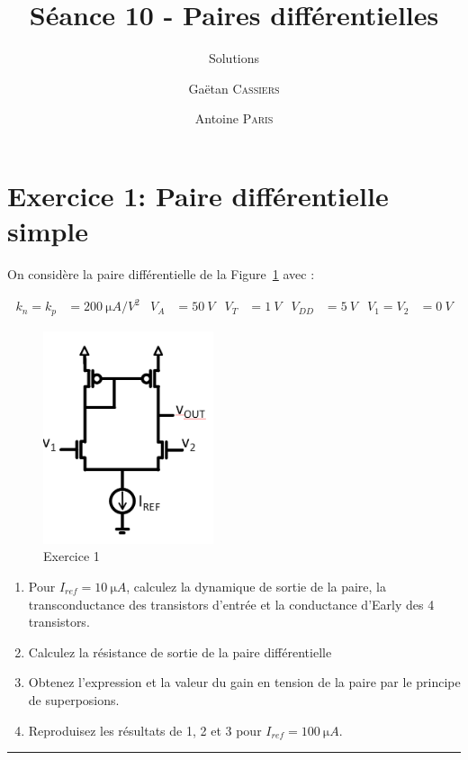 \documentclass[frenchb,DIV=14]{scrartcl}
\title{Séance 10 - Paires différentielles}
\subtitle{Solutions}
\author{\small Gaëtan \textsc{Cassiers} \and\small Antoine \textsc{Paris}}
\date{}
\begin{document}
\maketitle


\section*{Exercice 1: Paire différentielle simple}
On considère la paire différentielle de la Figure~\ref{fig11-1} avec :

\begin{align*}
    k_n = k_p &= \SI{200}{\micro A/V^2} &
    V_A &= \SI{50}{V} &
    V_T &= \SI{1}{V} &
    V_{DD} &= \SI{5}{V} &
    V_1 = V_2 &= \SI{0}{V}
\end{align*}

\begin{figure}
    \centering
    \includegraphics[width=5cm]{figures/fig11-1.png}
    \caption{Exercice 1}
    \label{fig11-1}
\end{figure}

\begin{enumerate}
    \item  Pour $I_{ref}= \SI{10}{\micro A}$, calculez la dynamique de sortie de la paire, la transconductance des transistors d'entrée et la conductance d'Early des 4 transistors.
    \item  Calculez la résistance de sortie de la paire différentielle
    \item  Obtenez l'expression et la valeur du gain en tension de la paire par le principe de superposions.
    \item  Reproduisez les résultats de 1, 2 et 3 pour $I_{ref}= \SI{100}{\micro A}$.
\end{enumerate}

\hspace{1cm}\hrule\hspace{1cm}
\end{document}
